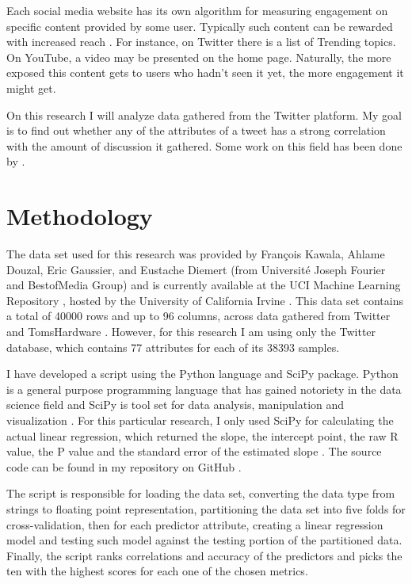 \documentclass[11pt]{article}
\begin{document}
Each social media website has its own algorithm for measuring engagement on specific content provided by some user. Typically such content can be rewarded with increased reach \cite{milan2015algorithms}. For instance, on Twitter there is a list of Trending topics. On YouTube, a video may be presented on the home page. Naturally, the more exposed this content gets to users who hadn't seen it yet, the more engagement it might get.

On this research I will analyze data gathered from the Twitter platform. My goal is to find out whether any of the attributes of a tweet has a strong correlation with the amount of discussion it gathered.  Some work on this field has been done by \cite{kawala:hal-00881395}. 


\section*{Methodology}
\label{method}
The data set used for this research was provided by François Kawala, Ahlame Douzal, Eric Gaussier, and Eustache Diemert (from Université Joseph Fourier and BestofMedia Group) and is currently available at the UCI Machine Learning Repository \cite{sets}, hosted by the University of California Irvine \cite{re3dataorg}. This data set contains a total of 40000 rows and up to 96 columns, across data gathered from Twitter and TomsHardware \cite{team}. However, for this research I am using only the Twitter database, which contains 77 attributes for each of its 38393 samples.

I have developed a script using the Python language and SciPy package. Python is a general purpose programming language \cite{van1995python} \cite{programming} that has gained notoriety in the data science field \cite{kdnuggets} \cite{results} and SciPy is tool set for data analysis, manipulation and visualization \cite{blanco2013learning}. For this particular research, I only used SciPy for calculating the actual linear regression, which returned the slope, the intercept point, the raw R value, the P value and the standard error of the estimated slope \cite{guide}. The source code can be found in my repository on GitHub \cite{thiagorcdlsocial_media_buzz}.

The script is responsible for loading the data set, converting the data type from strings to floating point representation, partitioning the data set into five folds for cross-validation, then for each predictor attribute, creating a linear regression model and testing such model against the testing portion of the partitioned data. Finally, the script ranks correlations and accuracy of the predictors and picks the ten with the highest scores for each one of the chosen metrics.
\end{document}

